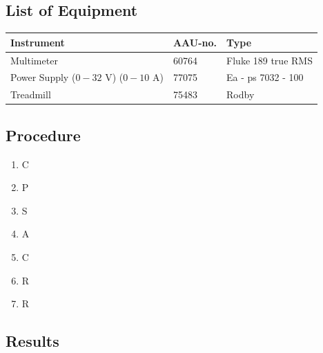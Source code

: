 \subsection{List of Equipment}

\begin{table}[H]
\begin{tabular}{|l|l|p{4cm}|}
\hline%
  \textbf{Instrument}                       &  \textbf{AAU-no.}  &  \textbf{Type}         \\
\hline%
  Multimeter                                &  60764             &  Fluke 189 true RMS    \\
\hline%
  Power Supply ($0 - 32$ V) ($0 - 10$ A)    &  77075             &  Ea - ps 7032 - 100    \\
\hline%
  Treadmill                                 &  75483             &  Rodby                 \\
\hline%
\end{tabular}
\end{table}

\subsection{Procedure}

\begin{enumerate}
  \item C
  \item P
  \item S
  \item A
  \item C
  \item R
  \item R
\end{enumerate}

\subsection{Results}


